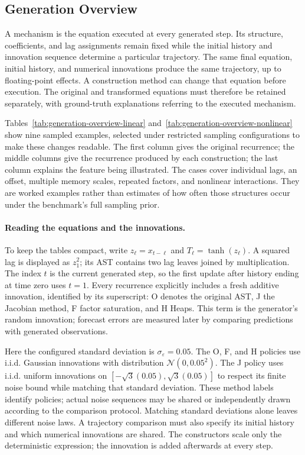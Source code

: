 \subsection{Generation Overview}
\label{sec:generation-overview}

A mechanism is the equation executed at every generated step. Its structure,
coefficients, and lag assignments remain fixed while the initial history and
innovation sequence determine a particular trajectory. The same final equation,
initial history, and numerical innovations produce the same trajectory, up to
floating-point effects. A construction method can change that equation before
execution. The original and transformed equations must therefore be retained
separately, with ground-truth explanations referring to the executed mechanism.

Tables~\ref{tab:generation-overview-linear} and~\ref{tab:generation-overview-nonlinear}
show nine sampled examples, selected under restricted sampling configurations
to make these changes readable. The first column gives the original recurrence;
the middle columns give the recurrence produced by each construction; the last
column explains the feature being illustrated. The cases cover individual lags,
an offset, multiple memory scales, repeated factors, and nonlinear interactions.
They are worked examples rather than estimates of how often those structures
occur under the benchmark's full sampling prior.

\paragraph{Reading the equations and the innovations.}
To keep the tables compact, write $z_\ell=x_{t-\ell}$ and
$T_\ell=\tanh(z_\ell)$. A squared lag is displayed as $z_1^2$; its AST contains
two lag leaves joined by multiplication. The index $t$ is the current generated
step, so the first update after history ending at time zero uses $t=1$.
Every recurrence explicitly includes a fresh additive innovation, identified
by its superscript: O denotes the original AST, J the Jacobian method,
F factor saturation, and H Heaps. This term is
the generator's random innovation; forecast errors are measured later by
comparing predictions with generated observations.

Here the configured standard deviation is $\sigma_\varepsilon=0.05$.
The O, F, and H policies use i.i.d. Gaussian innovations with distribution
$\mathcal N(0,0.05^2)$. The J policy uses i.i.d. uniform innovations on
$[-\sqrt{3}(0.05),\sqrt{3}(0.05)]$ to respect its finite noise bound while
matching that standard deviation. These method labels identify policies;
actual noise sequences may be shared or independently drawn according to the
comparison protocol. Matching standard deviations alone leaves different noise
laws. A trajectory comparison must also specify its initial history and which
numerical innovations are shared. The constructors scale only the deterministic
expression; the innovation is added afterwards at every step.

